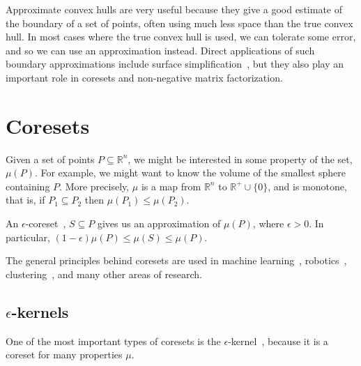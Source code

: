 

Approximate convex hulls are very useful because they give a good estimate of the boundary of a set of points, often using much less space than the true convex hull. In most cases where the true convex hull is used, we can tolerate some error, and so we can use an approximation instead. Direct applications of such boundary approximations include surface simplification~\cite{Heckbert97surveyof}, but they also play an important role in coresets and non-negative matrix factorization.

\section{Coresets}

Given a set of points $P \subseteq \mathbb{R}^n$, we might be interested in some property of the set, $\mu(P)$. For example, we might want to know the volume of the smallest sphere containing $P$. More precisely, $\mu$ is a map from $\mathbb{R}^n$ to $\mathbb{R}^+ \cup \{0\}$, and is monotone, that is, if $P_1 \subseteq P_2$ then $\mu(P_1) \leq \mu(P_2)$.

\begin{definition}
An $\epsilon$-coreset~\cite{Agarwal:2004:AEM:1008731.1008736,survey}, $S \subseteq P$ gives us an approximation of $\mu(P)$, where $\epsilon > 0$. In particular, $(1-\epsilon)\mu(P) \leq \mu(S) \leq \mu(P)$. 
\end{definition}

The general principles behind coresets are used in machine learning~\cite{cvms, peled-application, Feldman:2011:STM:2986459.2986698, Feldman, icml2015_bachem15}, robotics~\cite{6907021}, clustering~\cite{Har-Peled:2004:CKK:1007352.1007400}, and many other areas of research.

\subsection{$\epsilon$-kernels}

One of the most important types of coresets is the $\epsilon$-kernel~\cite{Agarwal:2004:AEM:1008731.1008736,survey}, because it is a coreset for many properties $\mu$.

